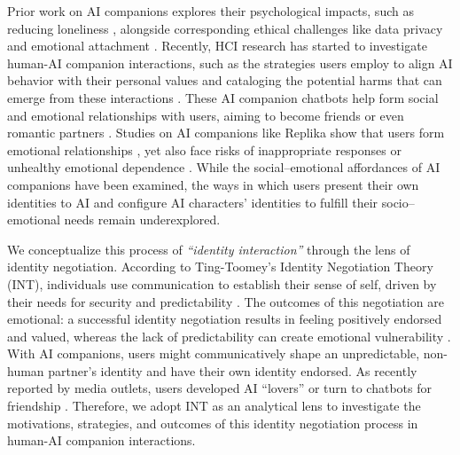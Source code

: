 \documentclass[sigconf, nonacm]{acmart}
\begin{document}
Prior work on AI companions explores their psychological impacts, such as reducing loneliness \cite{de2025ai, merrill2022ai}, alongside corresponding ethical challenges like data privacy and emotional attachment \cite{berridge2023ai, boine2023emotional}. Recently, HCI research has started to investigate human-AI companion interactions, such as the strategies users employ to align AI behavior with their personal values \cite{fan2025user} and cataloging the potential harms that can emerge from these interactions \cite{zhang2025dark}. These AI companion chatbots help form social and emotional relationships with users, aiming to become friends or even romantic partners \cite{de2015robots, ho2018psychological}. Studies on AI companions like Replika show that users form emotional relationships \cite{brandtzaeg2022my, ta2020user}, yet also face risks of inappropriate responses or unhealthy emotional dependence \cite{muresan2019chats, meng2023mediated}. 
While the social–emotional affordances of AI companions have been examined, the ways in which users present their own identities to AI and configure AI characters' identities to fulfill their socio–emotional needs remain underexplored. %

We conceptualize this process of \textit{``identity interaction''} through the lens of identity negotiation. According to Ting-Toomey's Identity Negotiation Theory (INT), individuals use communication to establish their sense of self, driven by their needs for security and predictability \cite{ting2017identity}. The outcomes of this negotiation are emotional: a successful identity negotiation results in feeling positively endorsed and valued, whereas the lack of predictability can create emotional vulnerability \cite{ting2017identity}. With AI companions, users might communicatively shape an unpredictable, non-human partner's identity and have their own identity endorsed. As recently reported by media outlets, users developed AI ``lovers'' or turn to chatbots for friendship \cite{Gecker2025, Liang2023}. Therefore, we adopt INT as an analytical lens to investigate the motivations, strategies, and outcomes of this identity negotiation process in human-AI companion interactions.
\end{document}
